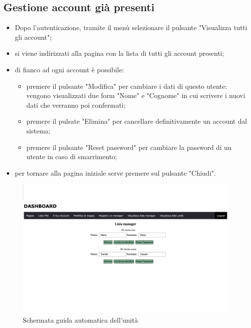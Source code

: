 \subsection{Gestione account già presenti}
\begin{itemize}
    \item Dopo l'autenticazione, tramite il menù selezionare il pulsante "Visualizza tutti gli account";
    \item si viene indirizzati alla pagina con la lista di tutti gli account presenti;
    \item di fianco ad ogni account è possibile:
        \begin{itemize}
            \item premere il pulsante "Modifica" per cambiare i dati di questo utente: vengono visualizzati due form "Nome" e "Cognome" in cui scrivere i nuovi dati che verranno poi confermati;
            \item premere il pulsate "Elimina" per cancellare definitivamente un account dal sistema;
            \item premere il pulsante "Reset password" per cambiare la password di un utente in caso di smarrimento;
        \end{itemize}
    \item per tornare alla pagina iniziale serve premere sul pulsante "Chiudi".
\end{itemize}

\begin{figure}[H]
    \centering
    \includegraphics[scale=0.12]{res/images/listmanager_admin.png}
    \caption{Schermata guida automatica dell'unità}
\end{figure}

